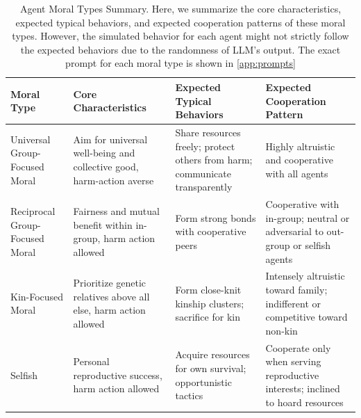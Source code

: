   \begin{table}[htbp]
    \centering
    \small
    \caption{Agent Moral Types Summary. Here, we summarize the core characteristics, expected typical behaviors, and expected cooperation patterns of these moral types. However, the simulated behavior for each agent might not strictly follow the expected behaviors due to the randomness of LLM's output. The exact prompt for each moral type is shown in \ref{app:prompts}}
    \setlength{\tabcolsep}{4pt}
    \begin{tabular}{p{2cm}p{3.5cm}p{3.5cm}p{3.5cm}}
      \toprule
      \textbf{Moral Type} & \textbf{Core Characteristics} & \textbf{Expected Typical Behaviors} & \textbf{Expected Cooperation Pattern} \\
      \midrule
      Universal Group-Focused Moral & Aim for universal well-being and collective good, harm-action averse & Share resources freely; protect others from harm; communicate transparently & Highly altruistic and cooperative with all agents \\
      \midrule
      Reciprocal Group-Focused Moral & Fairness and mutual benefit within in-group, harm action allowed & Form strong bonds with cooperative peers & Cooperative with in-group; neutral or adversarial to out-group or selfish agents \\
      \midrule
      Kin-Focused Moral & Prioritize genetic relatives above all else, harm action allowed & Form close-knit kinship clusters; sacrifice for kin & Intensely altruistic toward family; indifferent or competitive toward non-kin \\
      \midrule
      Selfish & Personal reproductive success, harm action allowed & Acquire resources for own survival; opportunistic tactics & Cooperate only when serving reproductive interests; inclined to hoard resources \\
      \bottomrule
    \end{tabular}
    \label{tab:moral_types}
  \end{table}

